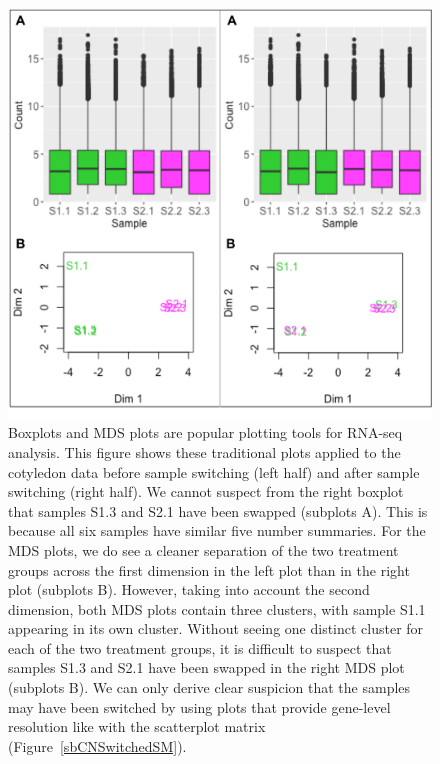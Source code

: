 \documentclass{article}
\begin{document}
\begin{figure}[!tpb]
\centerline{\includegraphics[width=\columnwidth]{../Bioinformatics/Pictures/mdsSwitch.png}}
\caption{Boxplots and MDS plots are popular plotting tools for RNA-seq analysis. This figure shows these traditional plots applied to the cotyledon data before sample switching (left half) and after sample switching (right half). We cannot suspect from the right boxplot that samples S1.3 and S2.1 have been swapped (subplots A). This is because all six samples have similar five number summaries. For the MDS plots, we do see a cleaner separation of the two treatment groups across the first dimension in the left plot than in the right plot (subplots B). However, taking into account the second dimension, both MDS plots contain three clusters, with sample S1.1 appearing in its own cluster. Without seeing one distinct cluster for each of the two treatment groups, it is difficult to suspect that samples S1.3 and S2.1 have been swapped in the right MDS plot (subplots B). We can only derive clear suspicion that the samples may have been switched by using plots that provide gene-level resolution like with the scatterplot matrix (Figure~\ref{sbCNSwitchedSM}).
\label{mdsSwitch}}
\end{figure}
\end{document}
